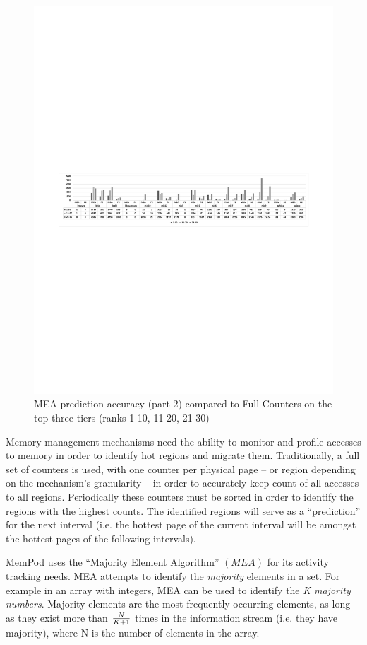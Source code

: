 \begin{figure}[t]
  \includegraphics[width=\textwidth]{figures/mea_3.pdf}
  \caption{MEA prediction accuracy (part 2) compared to Full Counters on the top three tiers (ranks 1-10, 11-20, 21-30)}
  \label{fig:mea_3}
\end{figure}

Memory management mechanisms need the ability to monitor and profile accesses to memory in order to identify hot regions and migrate them. Traditionally, a full set of counters is used, with one counter per physical page -- or region depending on the mechanism's granularity -- in order to accurately keep count of all accesses to all regions. Periodically these counters must be sorted in order to identify the regions with the highest counts. The identified regions will serve as a ``prediction'' for the next interval (i.e. the hottest page of the current interval will be amongst the hottest pages of the following intervals).

MemPod uses the ``Majority Element Algorithm'' $(MEA)$ for its activity tracking needs. MEA attempts to identify the \textit{majority} elements in a set. For example in an array with integers, MEA can be used to identify the \textit{K majority numbers}. Majority elements are the most frequently occurring elements, as long as they exist more than $N \over K+1$ times in the information stream (i.e. they have majority), where N is the number of elements in the array.

